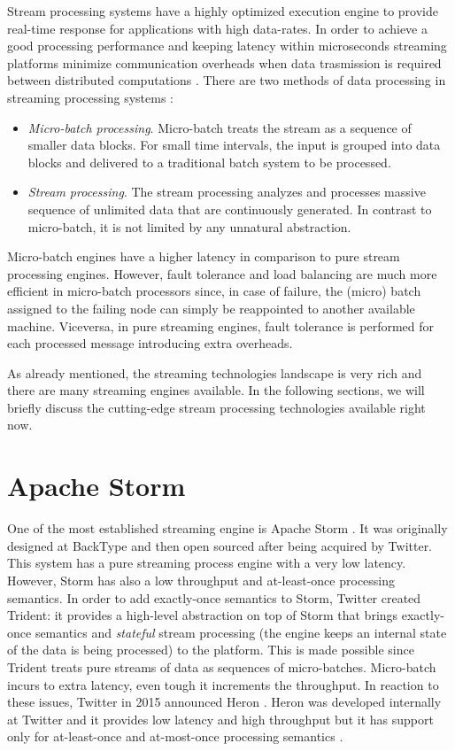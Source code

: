 Stream processing systems have a highly optimized execution engine to provide real-time response for applications with high data-rates. In order to achieve a good processing performance and keeping latency within microseconds streaming platforms minimize communication overheads when data trasmission is required between distributed computations \cite{streamprocessingcomparison}. There are two methods of data processing in streaming processing systems \cite{streamprocessingcomparison}:
\begin{itemize}
\item \emph{Micro-batch processing}. Micro-batch treats the stream as a sequence of smaller data blocks. For small time intervals, the input is grouped into data blocks and delivered to a traditional batch system to be processed.
\item \emph{Stream processing}. The stream processing analyzes and processes massive sequence of unlimited data that are continuously generated. In contrast to micro-batch, it is not limited by any unnatural abstraction.
\end{itemize}

Micro-batch engines have a higher latency in comparison to pure stream processing engines. However, fault tolerance and load balancing are much more efficient in micro-batch processors since, in case of failure, the (micro) batch assigned to the failing node can simply be reappointed to another available machine. Viceversa, in pure streaming engines, fault tolerance is performed for each processed message introducing extra overheads.

As already mentioned, the streaming technologies landscape is very rich and there are many streaming engines available. In the following sections, we will briefly discuss the cutting-edge stream processing technologies available right now.

\section{Apache Storm}
One of the most established streaming engine is Apache Storm \cite{apachestormonline}. It was originally designed at BackType and then open sourced after being acquired by Twitter. This system has a pure streaming process engine with a very low latency. However, Storm has also a low throughput and at-least-once processing semantics. In order to add exactly-once semantics to Storm, Twitter created Trident: 
it provides a high-level abstraction on top of Storm that brings exactly-once semantics and \emph{stateful} stream processing (the engine keeps an internal state of the data is being processed) to the platform. This is made possible since Trident treats pure streams of data as sequences of micro-batches. Micro-batch incurs to extra latency, even tough it increments the throughput. In reaction to these issues, Twitter in 2015 announced Heron \cite{herononline}. Heron was developed internally at Twitter and it provides low latency and high throughput but it has support only for at-least-once and at-most-once processing semantics \cite{streaming@twitter, heron}. 
